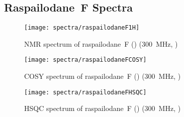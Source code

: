 
\begin{appendix}

\chapter{Raspailodane~F Spectra}
\label{app:raspailodaneFSpectra}

\begin{figure}[!hb]
\begin{flushright}
\texttt{[image: spectra/raspailodaneF1H]}
\end{flushright}
\centerline{\proton{} NMR spectrum of raspailodane~F () (300~MHz, )}
\end{figure}

\begin{figure}[p]
\texttt{[image: spectra/raspailodaneFCOSY]}
\centerline{COSY spectrum of raspailodane~F () (300~MHz, )}
\end{figure}

\begin{figure}[p]
\texttt{[image: spectra/raspailodaneFHSQC]}
\centerline{HSQC spectrum of raspailodane~F () (300~MHz, )}
\end{figure}

\end{appendix}
